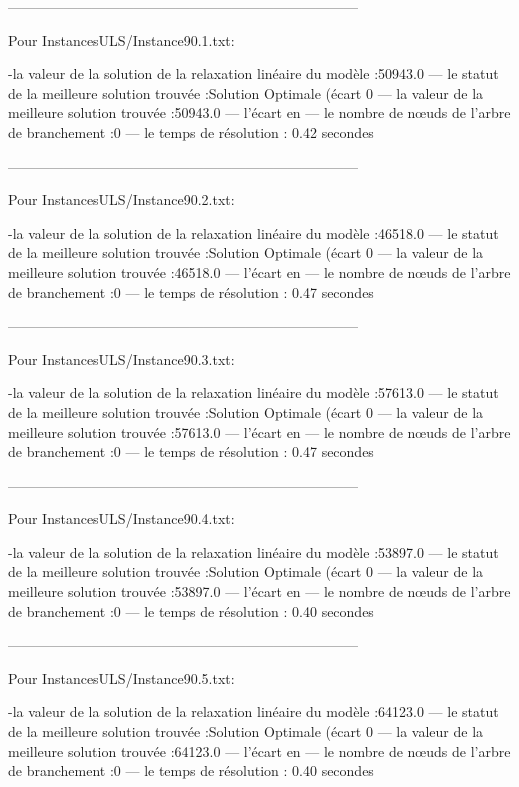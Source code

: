 ---------------------------------------------------------------------------

Pour InstancesULS/Instance90.1.txt:


-la valeur de la solution de la relaxation linéaire du modèle :50943.0
— le statut de la meilleure solution trouvée :Solution Optimale (écart 0%
— la valeur de la meilleure solution trouvée :50943.0
— l’écart en %
— le nombre de nœuds de l’arbre de branchement :0
— le temps de résolution : 0.42 secondes


---------------------------------------------------------------------------

Pour InstancesULS/Instance90.2.txt:


-la valeur de la solution de la relaxation linéaire du modèle :46518.0
— le statut de la meilleure solution trouvée :Solution Optimale (écart 0%
— la valeur de la meilleure solution trouvée :46518.0
— l’écart en %
— le nombre de nœuds de l’arbre de branchement :0
— le temps de résolution : 0.47 secondes


---------------------------------------------------------------------------

Pour InstancesULS/Instance90.3.txt:


-la valeur de la solution de la relaxation linéaire du modèle :57613.0
— le statut de la meilleure solution trouvée :Solution Optimale (écart 0%
— la valeur de la meilleure solution trouvée :57613.0
— l’écart en %
— le nombre de nœuds de l’arbre de branchement :0
— le temps de résolution : 0.47 secondes


---------------------------------------------------------------------------

Pour InstancesULS/Instance90.4.txt:


-la valeur de la solution de la relaxation linéaire du modèle :53897.0
— le statut de la meilleure solution trouvée :Solution Optimale (écart 0%
— la valeur de la meilleure solution trouvée :53897.0
— l’écart en %
— le nombre de nœuds de l’arbre de branchement :0
— le temps de résolution : 0.40 secondes


---------------------------------------------------------------------------

Pour InstancesULS/Instance90.5.txt:


-la valeur de la solution de la relaxation linéaire du modèle :64123.0
— le statut de la meilleure solution trouvée :Solution Optimale (écart 0%
— la valeur de la meilleure solution trouvée :64123.0
— l’écart en %
— le nombre de nœuds de l’arbre de branchement :0
— le temps de résolution : 0.40 secondes


